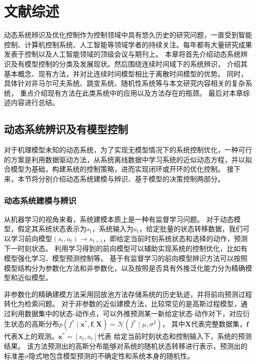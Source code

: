 \chapter{文献综述}
动态系统辨识及优化控制作为控制领域中具有悠久历史的研究问题，一直受到智能控制、计算机控制系统、人工智能等领域学者的持续关注。每年都有大量研究成果发表于控制以及人工智能领域的顶级会议与期刊上。
本章将首先介绍动态系统辨识及有模型控制的分类及发展现状。然后围绕连续时间域下的系统辨识，
介绍其基本概念、现有方法，并对比连续时间模型相比于离散时间模型的优势。
同时，具体针对非马尔可夫系统、跳变系统、随机性系统等与本文研究内容相关的复杂系统，
重点介绍现有方法在此类系统中的应用以及方法存在的瓶颈。
最后对本章综述内容进行总结。
\section{动态系统辨识及有模型控制}
\label{sec:2_1}
对于机理模型未知的动态系统，为了实现无模型情况下的系统控制优化，一种可行的方案是利用数据驱动方法，从系统离线数据中学习系统的近似动态方程，并以拟合模型为基础，构建系统的控制策略，进而实现闭环或开环的优化控制。
接下来，本节将分别介绍动态系统建模与辨识、基于模型的决策控制两部分。


\subsection{动态系统建模与辨识}
从机器学习的视角来看，系统建模本质上是一种有监督学习问题\cite{jordan1992forward}。
对于动态模型，假定其系统状态表示为$s_t$，系统输入为$a_t$，给定批量的状态转移数据，我们可以学习前向模型$\left(s_t, a_t\right) \rightarrow s_{t+1}$，即给定当前时刻系统状态和选择的动作，预测下一时刻状态。
利用学习得到的前向模型可以辅助实现系统的控制优化，比如有模型强化学习、模型预测控制等\cite{moerland2020model}。
基于有监督学习的前向模型辨识方法可以按照模型结构分为参数化方法和非参数化，以及按照是否具有外推泛化能力分为精确模型和近似模型。

非参数化的精确建模方法采用回放池\cite{lin1992memory}方法存储系统的历史轨迹，并将前向预测过程转化为检索问题。
对于非参数的近似建模方法，比较常见的是高斯过程模型\cite{deisenroth2011pilco,deisenroth2011pilco}，通过利用数据集中的状态-动作点，可以外推预测某一新给定状态-动作对下，对应衍生状态的高斯分布$p\left(f^* \mid \boldsymbol{x}^*, \boldsymbol{f}, \boldsymbol{X}\right)=\mathcal{N}\left(f^* \mid \mu, \sigma^2\right)$，
其中$\boldsymbol{X}$代表完整数据集，$\boldsymbol{f}$代表$\boldsymbol{X}$上的观测。$\boldsymbol{x}^*=[s_t,a_t]$代表
给定当前时刻状态和控制输入下，系统的预测结果。
该方法预测出的高斯分布能够对系统的随机状态转移进行表示，预测出的标准差$\sigma$隐式地包含模型预测的不确定性和系统本身的随机性。

